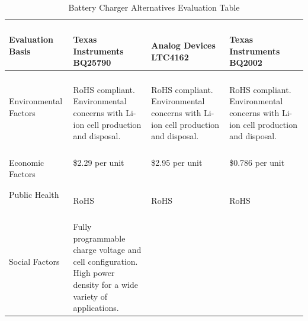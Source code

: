\documentclass[12pt]{article}
\begin{document}
\begin{table}[h!]
\centering
\caption{Battery Charger Alternatives Evaluation Table}
\begin{tabular}{| l | l | l | l |}
\hline
\parbox{0.17\linewidth}{\centering Evaluation Basis} & \parbox{0.240\linewidth}{\centering \hfill\\ Texas Instruments BQ25790\\
} & \parbox{0.240\linewidth}{\centering\hfill\\ Analog Devices LTC4162\\} & \parbox{0.240\linewidth}{\centering\hfill\\ Texas Instruments BQ2002\\}\\
\hline
\parbox{0.17\linewidth}{\raggedleft Environmental Factors} &
\parbox{0.240\linewidth}{\hfill \\
RoHS compliant.\\
Environmental concerns with Li-ion cell production and disposal.
\\} & 
\parbox{0.240\linewidth}{\hfill \\
RoHS compliant.\\
Environmental concerns with Li-ion cell production and disposal.
\\} & \parbox{0.240\linewidth}{\hfill \\
RoHS compliant.\\
Environmental concerns with Li-ion cell production and disposal.
\\}\\ \hline
\parbox{0.17\linewidth}{\raggedleft\hfill\\ Economic Factors\\[0.5em]} &
\$2.29 per unit &
\$2.95 per unit &
\$0.786 per unit \\
\hline
\parbox{0.17\linewidth}{\raggedleft Public Health} & 
\parbox{0.240\linewidth}{\hfill \\
RoHS
\\} & 
\parbox{0.240\linewidth}{\hfill \\
RoHS
\\} & \parbox{0.240\linewidth}{\hfill \\
RoHS
\\}\\ \hline
\parbox{0.17\linewidth}{\raggedleft Social Factors} & 
\parbox{0.240\linewidth}{\hfill \\
Fully programmable charge voltage and cell configuration.\\
High power density for a wide variety of applications.
}
\end{tabular}
\end{table}
\end{document}
